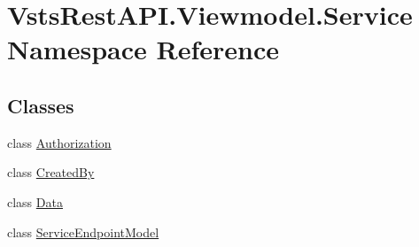 \hypertarget{namespace_vsts_rest_a_p_i_1_1_viewmodel_1_1_service}{}\section{Vsts\+Rest\+A\+P\+I.\+Viewmodel.\+Service Namespace Reference}
\label{namespace_vsts_rest_a_p_i_1_1_viewmodel_1_1_service}
\subsection*{Classes}
\begin{DoxyCompactItemize}
\item 
class \mbox{\hyperlink{class_vsts_rest_a_p_i_1_1_viewmodel_1_1_service_1_1_authorization}{Authorization}}
\item 
class \mbox{\hyperlink{class_vsts_rest_a_p_i_1_1_viewmodel_1_1_service_1_1_created_by}{Created\+By}}
\item 
class \mbox{\hyperlink{class_vsts_rest_a_p_i_1_1_viewmodel_1_1_service_1_1_data}{Data}}
\item 
class \mbox{\hyperlink{class_vsts_rest_a_p_i_1_1_viewmodel_1_1_service_1_1_service_endpoint_model}{Service\+Endpoint\+Model}}
\end{DoxyCompactItemize}
